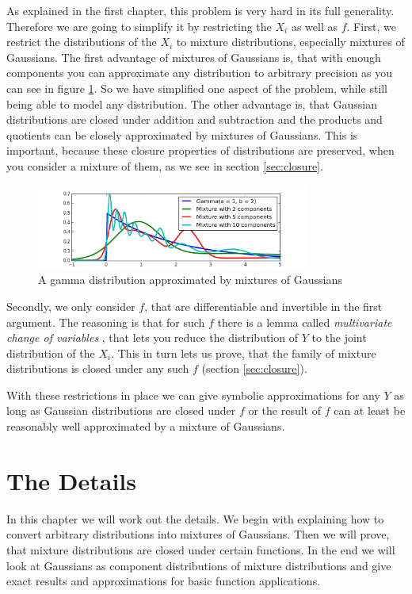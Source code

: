 \documentclass[11pt,a4paper]{book}
\begin{document}
As explained in the first chapter, this problem is very hard in its full
generality. Therefore we are going to simplify it by restricting the $X_{i}$ as
well as $f$. First, we restrict the distributions of the $X_{i}$ to mixture
distributions, especially mixtures of Gaussians. The first advantage of mixtures
of Gaussians is, that with enough components you can approximate any
distribution to arbitrary precision as you can see in figure
\ref{fig:idea-em}. So we have simplified one aspect of the problem, while still
being able to model any distribution. The other advantage is, that Gaussian
distributions are closed under addition and subtraction and the products and
quotients can be closely approximated by mixtures of Gaussians. This is
important, because these closure properties of distributions are preserved, when
you consider a mixture of them, as we see in section \ref{sec:closure}.
\begin{figure}[h]
  \centering
  \includegraphics[width=0.8\textwidth]{thesis/idea/em}
  \caption{A gamma distribution approximated by mixtures of Gaussians}
  \label{fig:idea-em}
\end{figure}

Secondly, we only consider $f$, that are differentiable and invertible in the
first argument. The reasoning is that for such $f$ there is a lemma called
\emph{multivariate change of variables} \cite[chapter~2.6.2.1]{murphy}, that
lets you reduce the distribution of $Y$ to the joint distribution of the
$X_{i}$. This in turn lets us prove, that the family of mixture distributions is
closed under any such $f$ (section \ref{sec:closure}).

With these restrictions in place we can give symbolic approximations for any $Y$
as long as Gaussian distributions are closed under $f$ or the result of $f$ can
at least be reasonably well approximated by a mixture of Gaussians.

\chapter{The Details}
\label{ch:theory}

In this chapter we will work out the details. We begin with explaining how to
convert arbitrary distributions into mixtures of Gaussians. Then we will prove,
that mixture distributions are closed under certain functions. In the end we
will look at Gaussians as component distributions of mixture distributions and
give exact results and approximations for basic function applications.
\end{document}
